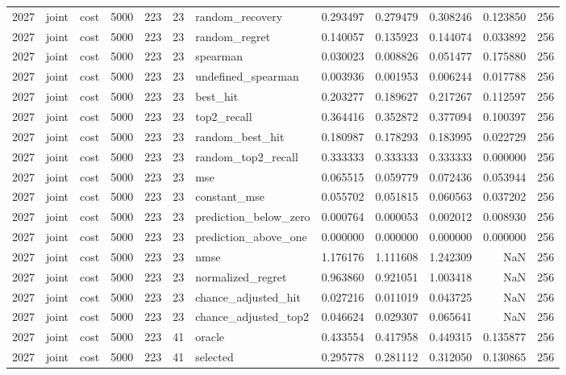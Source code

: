 \begin{tabular}{rllrrrlrrrrr}
2027 & joint & cost & 5000 & 223 & 23 & random_recovery & 0.293497 & 0.279479 & 0.308246 & 0.123850 & 256 \\
2027 & joint & cost & 5000 & 223 & 23 & random_regret & 0.140057 & 0.135923 & 0.144074 & 0.033892 & 256 \\
2027 & joint & cost & 5000 & 223 & 23 & spearman & 0.030023 & 0.008826 & 0.051477 & 0.175880 & 256 \\
2027 & joint & cost & 5000 & 223 & 23 & undefined_spearman & 0.003936 & 0.001953 & 0.006244 & 0.017788 & 256 \\
2027 & joint & cost & 5000 & 223 & 23 & best_hit & 0.203277 & 0.189627 & 0.217267 & 0.112597 & 256 \\
2027 & joint & cost & 5000 & 223 & 23 & top2_recall & 0.364416 & 0.352872 & 0.377094 & 0.100397 & 256 \\
2027 & joint & cost & 5000 & 223 & 23 & random_best_hit & 0.180987 & 0.178293 & 0.183995 & 0.022729 & 256 \\
2027 & joint & cost & 5000 & 223 & 23 & random_top2_recall & 0.333333 & 0.333333 & 0.333333 & 0.000000 & 256 \\
2027 & joint & cost & 5000 & 223 & 23 & mse & 0.065515 & 0.059779 & 0.072436 & 0.053944 & 256 \\
2027 & joint & cost & 5000 & 223 & 23 & constant_mse & 0.055702 & 0.051815 & 0.060563 & 0.037202 & 256 \\
2027 & joint & cost & 5000 & 223 & 23 & prediction_below_zero & 0.000764 & 0.000053 & 0.002012 & 0.008930 & 256 \\
2027 & joint & cost & 5000 & 223 & 23 & prediction_above_one & 0.000000 & 0.000000 & 0.000000 & 0.000000 & 256 \\
2027 & joint & cost & 5000 & 223 & 23 & nmse & 1.176176 & 1.111608 & 1.242309 & NaN & 256 \\
2027 & joint & cost & 5000 & 223 & 23 & normalized_regret & 0.963860 & 0.921051 & 1.003418 & NaN & 256 \\
2027 & joint & cost & 5000 & 223 & 23 & chance_adjusted_hit & 0.027216 & 0.011019 & 0.043725 & NaN & 256 \\
2027 & joint & cost & 5000 & 223 & 23 & chance_adjusted_top2 & 0.046624 & 0.029307 & 0.065641 & NaN & 256 \\
2027 & joint & cost & 5000 & 223 & 41 & oracle & 0.433554 & 0.417958 & 0.449315 & 0.135877 & 256 \\
2027 & joint & cost & 5000 & 223 & 41 & selected & 0.295778 & 0.281112 & 0.312050 & 0.130865 & 256 \\

\end{tabular}
